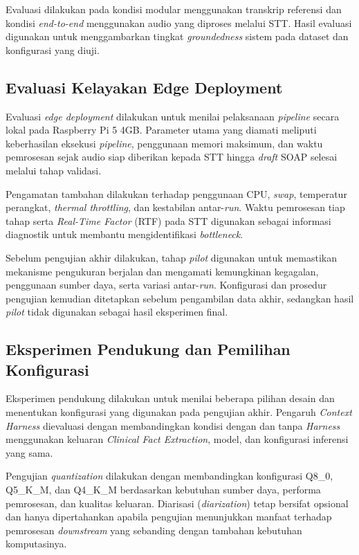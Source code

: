 Evaluasi dilakukan pada kondisi modular menggunakan transkrip referensi dan kondisi \emph{end-to-end} menggunakan audio yang diproses melalui STT. Hasil evaluasi digunakan untuk menggambarkan tingkat \emph{groundedness} sistem pada dataset dan konfigurasi yang diuji.

\subsection{Evaluasi Kelayakan Edge Deployment}
\label{subsec:evaluasiedgedeploy}

Evaluasi \emph{edge deployment} dilakukan untuk menilai pelaksanaan \emph{pipeline} secara lokal pada Raspberry Pi 5 4GB. Parameter utama yang diamati meliputi keberhasilan eksekusi \emph{pipeline}, penggunaan memori maksimum, dan waktu pemrosesan sejak audio siap diberikan kepada STT hingga \emph{draft} SOAP selesai melalui tahap validasi.

Pengamatan tambahan dilakukan terhadap penggunaan CPU, \emph{swap}, temperatur perangkat, \emph{thermal throttling}, dan kestabilan antar-\emph{run}. Waktu pemrosesan tiap tahap serta \emph{Real-Time Factor} (RTF) pada STT digunakan sebagai informasi diagnostik untuk membantu mengidentifikasi \emph{bottleneck}.

Sebelum pengujian akhir dilakukan, tahap \emph{pilot} digunakan untuk memastikan mekanisme pengukuran berjalan dan mengamati kemungkinan kegagalan, penggunaan sumber daya, serta variasi antar-\emph{run}. Konfigurasi dan prosedur pengujian kemudian ditetapkan sebelum pengambilan data akhir, sedangkan hasil \emph{pilot} tidak digunakan sebagai hasil eksperimen final.

\subsection{Eksperimen Pendukung dan Pemilihan Konfigurasi}
\label{subsec:eksperimenpendukung}

Eksperimen pendukung dilakukan untuk menilai beberapa pilihan desain dan menentukan konfigurasi yang digunakan pada pengujian akhir. Pengaruh \emph{Context Harness} dievaluasi dengan membandingkan kondisi dengan dan tanpa \emph{Harness} menggunakan keluaran \emph{Clinical Fact Extraction}, model, dan konfigurasi inferensi yang sama.

Pengujian \emph{quantization} dilakukan dengan membandingkan konfigurasi Q8\_0, Q5\_K\_M, dan Q4\_K\_M berdasarkan kebutuhan sumber daya, performa pemrosesan, dan kualitas keluaran. Diarisasi (\emph{diarization}) tetap bersifat opsional dan hanya dipertahankan apabila pengujian menunjukkan manfaat terhadap pemrosesan \emph{downstream} yang sebanding dengan tambahan kebutuhan komputasinya.

